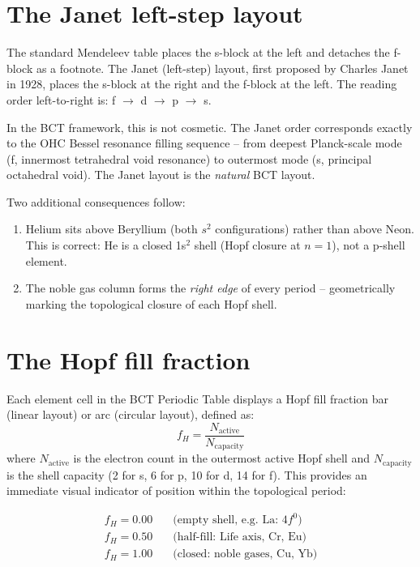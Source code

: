 \documentclass[aps,prl,onecolumn,superscriptaddress]{revtex4-2}
\begin{document}
\section{The Janet left-step layout}

The standard Mendeleev table places the s-block at the left
and detaches the f-block as a footnote. The Janet (left-step)
layout, first proposed by Charles Janet in 1928, places the
s-block at the right and the f-block at the left.
The reading order left-to-right is: f $\to$ d $\to$ p $\to$ s.

In the BCT framework, this is not cosmetic.
The Janet order corresponds exactly to the OHC Bessel resonance
filling sequence -- from deepest Planck-scale mode (f, innermost
tetrahedral void resonance) to outermost mode (s, principal
octahedral void). The Janet layout is the \emph{natural} BCT layout.

Two additional consequences follow:
\begin{enumerate}
\item Helium sits above Beryllium (both $s^2$ configurations)
  rather than above Neon. This is correct: He is a closed
  1s$^2$ shell (Hopf closure at $n=1$), not a p-shell element.
\item The noble gas column forms the \emph{right edge} of every
  period -- geometrically marking the topological closure of each
  Hopf shell.
\end{enumerate}

\section{The Hopf fill fraction}

Each element cell in the BCT Periodic Table displays a Hopf fill
fraction bar (linear layout) or arc (circular layout), defined as:
%
\begin{equation}
  f_H = \frac{N_\mathrm{active}}{N_\mathrm{capacity}}
\end{equation}
%
where $N_\mathrm{active}$ is the electron count in the outermost
active Hopf shell and $N_\mathrm{capacity}$ is the shell capacity
(2 for s, 6 for p, 10 for d, 14 for f).
This provides an immediate visual indicator of position within
the topological period:

\begin{align}
  f_H = 0.00 &\quad \text{(empty shell, e.g.\ La: }4f^0\text{)} \nonumber\\
  f_H = 0.50 &\quad \text{(half-fill: Life axis, Cr, Eu)} \nonumber\\
  f_H = 1.00 &\quad \text{(closed: noble gases, Cu, Yb)}
\end{align}
\end{document}
